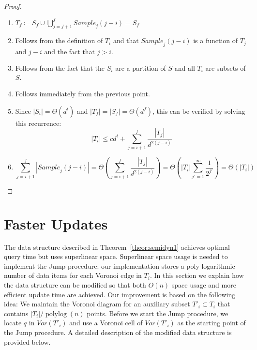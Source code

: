 \documentclass[12pt,a4paper,USenglish,cleveref, autoref, thm-restate]{article}
\newcommand{\Sample}{\mathit{Sample}}
\newcommand{\Voron}{\mathit{Vor}}
\newcommand{\john}[1]{\textcolor{red}{#1}}
\newcommand{\Sample}{\mathit{Sample}}
\newcommand{\Voron}{\mathit{Vor}}
\newcommand{\john}[1]{\textcolor{red}{#1}}
\newcommand{\Sample}{\mathit{Sample}}
\newcommand{\Voron}{\mathit{Vor}}
\newcommand{\john}[1]{\textcolor{red}{#1}}
\begin{document}
\begin{proof} \ \\
	\begin{enumerate}
 \setlength{\itemsep}{1pt}
\setlength{\parskip}{0pt}
\setlength{\parsep}{0pt} 
		\item $ T_f \coloneqq S_f \cup \bigcup_{j=f+1}^{f} \Sample_j(j-i) = S_f$
		\item Follows from the definition of $T_i$ and that $\Sample_j(j-i)$ is a function of $T_j$ and $j-i$ and the fact that $j>i$. 
		\item Follows from the fact that the $S_i$ are a partition of $S$ and all $T_i$ are subsets of $S$.
		\item Follows immediately from the previous point.
		\item 
  Since $|S_i|=\Theta(d^i)$ and $|T_f|=|S_f|=\Theta(d^f)$,
  this can be verified by solving this recurrence: %
		$$ |T_i| \leq cd^i + \sum_{j=i+1}^f \frac{|T_j|}{d^{2(j-i)}}
		$$
		\item $$
		\sum_{j=i+1}^f |\Sample_j(j-i)|
	=
\Theta\left(		\sum_{j=i+1}^f\frac{|T_j|}{d^{2(j-i)}}	\right)
=
\Theta\left(	 |T_i|	\sum_{j'=1}^{\infty}\frac{1}{2^{j'}}	\right) =\Theta(|T_i|)
$$
	\end{enumerate}
\end{proof}



\section{Faster Updates}
\label{sec:ins-faster}
The data structure described in Theorem~\ref{theor:semidyn1} achieves optimal query time but  uses superlinear space. Superlinear space usage is needed to implement the Jump procedure: our implementation stores a poly-logarithmic number of  data items for each Voronoi edge in $T_i$. In this section we explain how the data structure can be modified so that both $O(n)$ space usage and more efficient update time are achieved.
Our improvement is based on the following idea: We maintain the Voronoi diagram for an auxiliary subset $T'_i\subset T_i$ that contains $|T_i|/\operatorname{polylog}(n)$ points.  Before we start the Jump procedure, we locate $q$ in $\Voron(T'_i)$ and use a Voronoi cell of $\Voron(T'_i)$ as the starting point of the Jump procedure.
A  detailed description of the modified data structure is provided below. 
\end{document}
